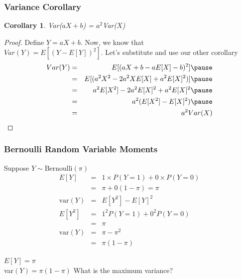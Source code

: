 \documentclass[handout]{beamer}
\newtheorem{cor}{Corollary}
\numberwithin{equation}{section}
\begin{document}
\begin{frame}
\frametitle{Variance Corollary} 

\begin{cor}
Var($aX  + b$)  = $a^2$Var($X$) 
\end{cor} 
\pause 
\begin{proof} 
Define $Y = aX +b$.  Now, we know that \\ \pause 
$Var(Y) = E[(Y - E[Y])^2]$.  Let's substitute and use our other corollary \pause 
\begin{eqnarray}
Var(Y) & =& E[ (aX + b - a E[X] - b)^2 ] \nonumber  \pause \\
 & = & E[ (a^2 X^2 - 2 a^2 X E[X] + a^2 E[X]^2)] \nonumber  \pause \\
& = & a^2E[X^2] -2a^2E[X]^2 + a^2 E[X]^2 \nonumber  \pause \\
& = & a^2(E[X^2] - E[X]^2) \nonumber \pause  \\
 & = & a^2 Var(X) \nonumber 
 \end{eqnarray}
\end{proof} 

\end{frame}


\begin{frame}
\frametitle{Bernoulli Random Variable \alert{Moments}}
Suppose $Y \sim \text{Bernoulli}(\pi)$ \\


\begin{eqnarray} 
E[Y] & = & 1 \times P(Y = 1) + 0 \times P(Y = 0) \nonumber \\
& = & \pi + 0 (1 - \pi) \nonumber  = \pi  \nonumber \\
\text{var}(Y) & = & E[Y^2] - E[Y]^2 \nonumber  \\
E[Y^2] & = & 1^{2} P(Y = 1) + 0^{2} P(Y = 0) \nonumber \\
& = & \pi \nonumber \\ 
\text{var}(Y) & = & \pi - \pi^{2} \nonumber \\
& = & \pi(1 - \pi ) \nonumber 
\end{eqnarray}

$E[Y] = \pi$\\
var$(Y) = \pi(1- \pi) $
What is the maximum variance?


\pause \pause \pause \pause \pause \pause \pause 


\end{frame}
\end{document}
